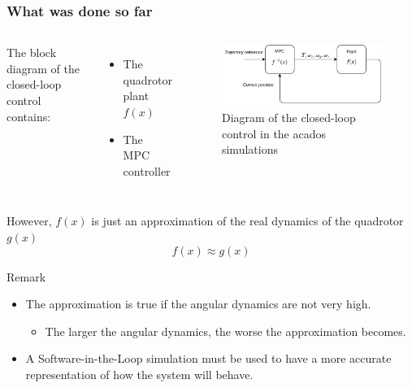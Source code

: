 \documentclass{thesisbeamer}
\newcommand\Fontvi{\fontsize{9}{10}\selectfont}
\begin{document}
\begin{frame}
			\frametitle{What was done so far}
			\Fontvi
			\begin{columns}
			\column{0.5\textwidth}
			The block diagram of the closed-loop control contains:
			\begin{itemize} %
				\item The quadrotor plant $f(x)$
				\item The MPC controller
			\end{itemize}
			\column{0.5\textwidth}
			\begin{figure}
				\centering
				\includegraphics[width=\textwidth]{diagrams/old_sim_diagram.png}
				\caption{Diagram of the closed-loop control in the acados simulations}
			\end{figure}
			 \end{columns}
			 However, $f(x)$ is just an approximation of the real dynamics of the quadrotor $g(x)$
			\begin{equation*}
				f(x) \approx g(x)
			\end{equation*}						 
			
			\begin{block}{Remark}
			\begin{itemize} %
				\item The approximation is true if the angular dynamics are not very high.
				\begin{itemize}
					\item \fontsize{9pt}{10pt}\selectfont The larger the angular dynamics, the worse the approximation becomes. 
				\end{itemize}
				
				\item A Software-in-the-Loop simulation must be used to have a more accurate representation of how the system will behave.
			\end{itemize}
			\end{block}
		\end{frame}
		
\end{document}
